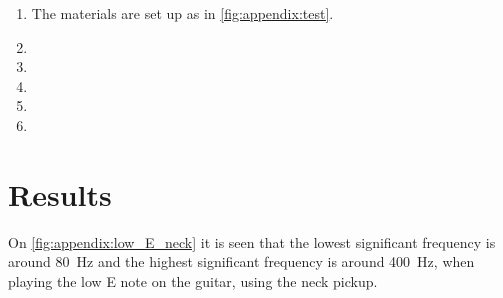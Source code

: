 \begin{enumerate}
\item The materials are set up as in \autoref{fig:appendix:test}.
\item 
\item  
\item  
\item 
\item 
\end{enumerate}

\section*{Results}


On  \autoref{fig:appendix:low_E_neck} it is seen that the lowest significant frequency is around \SI{80}{\hertz} and the highest significant frequency is around \SI{400}{\hertz}, when playing the low E note on the guitar, using the neck pickup.

